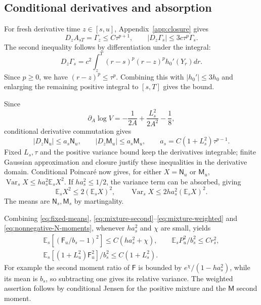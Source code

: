 \documentclass[11pt,a4paper]{amsart}
\theoremstyle{plain}
\theoremstyle{definition}
\theoremstyle{remark}
\DeclareMathOperator{\Var}{Var}
\newcommand{\EE}{\mathbb{E}}
\newcommand{\Es}{\EE_s}
\begin{document}
\subsection{Conditional derivatives and absorption}
For fresh derivative time $z\in[s,u]$, Appendix~\ref{app:closure} gives
\begin{equation}\label{eq:nonnegative-Gamma-derivative}
 D_zA_{sT}=\Gamma_z\le C\tau^{p+1},\qquad
 |D_z\Gamma_s|\le3c\tau^p\Gamma_s.
\end{equation}
The second inequality follows by differentiation under the integral:
\[
 D_z\Gamma_s=c^2\int_z^T(r-s)^p(r-z)^ph_0'(Y_r)dr.
\]
Since $p\ge0$, we have $(r-z)^p\le\tau^p$. Combining this with $|h_0'|\le3h_0$ and enlarging the remaining positive integral to $[s,T]$ gives the bound.

Since
\begin{equation}\label{eq:V-variance-logderivative}
 \partial_A\log V=-\frac1{2A}+\frac{L_s^2}{2A^2}-\frac18,
\end{equation}
conditional derivative commutation gives
\begin{equation}\label{eq:nonnegative-N-derivative}
 |D_z\mathsf N_u|\le a_s\mathsf N_u,
 \qquad |D_z\mathsf M_u|\le a_s\mathsf M_u,
 \qquad a_s=C(1+L_s^2)\tau^{p-1}.
\end{equation}
Fixed $L_s,\tau$ and the positive variance bound keep the derivatives integrable; finite Gaussian approximation and closure justify these inequalities in the derivative domain. Conditional Poincar\'e now gives, for either $X=\mathsf N_u$ or $\mathsf M_u$,
$\Var_sX\le h a_s^2\Es X^2$. If $ha_s^2\le1/2$, the variance term can be absorbed, giving
\begin{equation}\label{eq:nonnegative-N-moments}
 \Es X^2\le2(\Es X)^2,
 \qquad \Var_sX\le2ha_s^2(\Es X)^2.
\end{equation}
The means are $\mathsf N_s,\mathsf M_s$ by martingality.

Combining \eqref{eq:fixed-means}, \eqref{eq:mixture-second}--\eqref{eq:mixture-weighted} and \eqref{eq:nonnegative-N-moments}, whenever $ha_s^2$ and $\chi$ are small, yields
\begin{equation}\label{eq:nonnegative-F-moments}
 \begin{gathered}
 \Es[(\mathsf F_u/b_s-1)^2]\le C(ha_s^2+\chi),
 \qquad \Es P_u^2/b_s^2\le C r_s^2,\\
 \Es[(1+L_u^2)\mathsf F_u^2]/b_s^2\le C(1+L_s^2).
 \end{gathered}
\end{equation}
For example the second moment ratio of $\mathsf F$ is bounded by $e^\chi/(1-ha_s^2)$, while its mean is $b_s$, so subtracting one gives its relative variance. The weighted assertion follows by conditional Jensen for the positive mixture and the $\mathsf M$ second moment.
\end{document}
